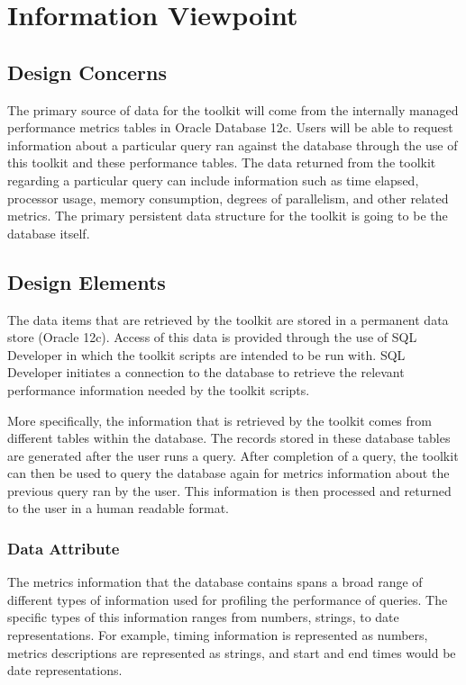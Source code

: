 \documentclass[draftclsnofoot, onecolumn, compsoc, 10pt]{IEEEtran}
\begin{document}

\section{Information Viewpoint}
\subsection{Design Concerns}
The primary source of data for the toolkit will come from the internally managed performance metrics tables in Oracle Database 12c.
Users will be able to request information about a particular query ran against the database through the use of this toolkit and these performance tables.
The data returned from the toolkit regarding a particular query can include information such as time elapsed, processor usage, memory consumption, degrees of parallelism, and other related metrics.
The primary persistent data structure for the toolkit is going to be the database itself.

\subsection{Design Elements}
The data items that are retrieved by the toolkit are stored in a permanent data store (Oracle 12c).
Access of this data is provided through the use of SQL Developer in which the toolkit scripts are intended to be run with.
SQL Developer initiates a connection to the database to retrieve the relevant performance information needed by the toolkit scripts. 


More specifically, the information that is retrieved by the toolkit comes from different tables within the database.
The records stored in these database tables are generated after the user runs a query.
After completion of a query, the toolkit can then be used to query the database again for metrics information about the previous query ran by the user.
This information is then processed and returned to the user in a human readable format.

\subsubsection{Data Attribute}
The metrics information that the database contains spans a broad range of different types of information used for profiling the performance of queries.
The specific types of this information ranges from numbers, strings, to date representations.
For example, timing information is represented as numbers, metrics descriptions are represented as strings, and start and end times would be date representations.
\end{document}
